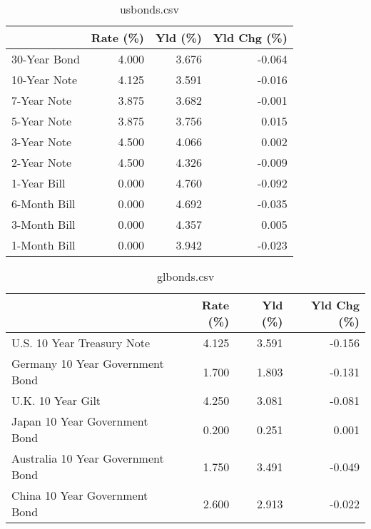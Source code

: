 \documentclass{article}%
\begin{document}
%


\begin{table}[htbp]%
\caption{usbonds.csv}%
\centering%
\begin{adjustbox}{width=1\textwidth}%
\begin{tabular}{lrrr}
\toprule
             &  Rate (\%) &  Yld (\%) &  Yld Chg (\%) \\
\midrule
30-Year Bond &     4.000 &    3.676 &       -0.064 \\
10-Year Note &     4.125 &    3.591 &       -0.016 \\
 7-Year Note &     3.875 &    3.682 &       -0.001 \\
 5-Year Note &     3.875 &    3.756 &        0.015 \\
 3-Year Note &     4.500 &    4.066 &        0.002 \\
 2-Year Note &     4.500 &    4.326 &       -0.009 \\
 1-Year Bill &     0.000 &    4.760 &       -0.092 \\
6-Month Bill &     0.000 &    4.692 &       -0.035 \\
3-Month Bill &     0.000 &    4.357 &        0.005 \\
1-Month Bill &     0.000 &    3.942 &       -0.023 \\
\bottomrule
\end{tabular}
%
\end{adjustbox}%
\end{table}

%


\begin{table}[htbp]%
\caption{glbonds.csv}%
\centering%
\begin{adjustbox}{width=1\textwidth}%
\begin{tabular}{lrrr}
\toprule
                                  &  Rate (\%) &  Yld (\%) &  Yld Chg (\%) \\
\midrule
       U.S. 10 Year Treasury Note &     4.125 &    3.591 &       -0.156 \\
  Germany 10 Year Government Bond &     1.700 &    1.803 &       -0.131 \\
                U.K. 10 Year Gilt &     4.250 &    3.081 &       -0.081 \\
    Japan 10 Year Government Bond &     0.200 &    0.251 &        0.001 \\
Australia 10 Year Government Bond &     1.750 &    3.491 &       -0.049 \\
    China 10 Year Government Bond &     2.600 &    2.913 &       -0.022 \\
\bottomrule
\end{tabular}
%
\end{adjustbox}%
\end{table}
\end{document}
